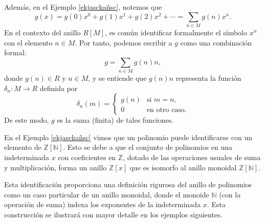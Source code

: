 \vspace{0.5cm}

Además, en el Ejemplo \ref{ekjasckañsc}, notemos que
\[
g(x) = g(0)x^0 + g(1)x^1 + g(2)x^2 + \cdots = \sum_{n \in M} g(n)x^n.
\]
En el contexto del anillo \( R[M] \), es común identificar formalmente el símbolo \( x^n \) con el elemento \( n \in M \). Por tanto, podemos escribir a \( g \) como una combinación formal:
\[
g = \sum_{n \in M} g(n)  n,
\]
donde \( g(n) \in R \) y \( n \in M \), y se entiende que \( g(n)n \) representa la función \( \delta_n \colon M \to R \) definida por
\[
\delta_n(m) = \begin{cases}
	g(n) & \text{si } m = n, \\
	0 & \text{en otro caso}.
\end{cases}
\]
De este modo, \( g \) es la suma (finita) de tales funciones. \\

\begin{observacion}
\end{observacion}

En el Ejemplo \ref{ekjasckañsc} vimos que un polinomio puede identificarse con un elemento de $\mathbb{Z}[\mathbb{N}]$. Esto se debe a que el conjunto de polinomios en una indeterminada $x$ con coeficientes en $\mathbb{Z}$, dotado de las operaciones usuales de suma y multiplicación, forma un anillo $\mathbb{Z}[x]$ que es isomorfo al anillo monoidal $\mathbb{Z}[\mathbb{N}]$.

\medskip
\noindent
Esta identificación proporciona una definición rigurosa del anillo de polinomios como un caso particular de un anillo monoidal, donde el monoide $\mathbb{N}$ (con la operación de suma) indexa los exponentes de la indeterminada $x$. Esta construcción se ilustrará con mayor detalle en los ejemplos siguientes.

\begin{ejemplo}
\end{ejemplo}

